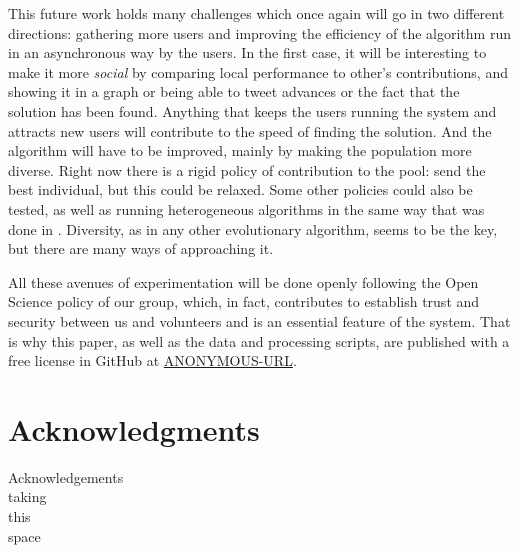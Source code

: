 \documentclass[runningheads,a4paper]{llncs}\usepackage[]{graphicx}\usepackage[]{color}
\begin{document}
This future work holds many challenges which once again will go in two
different directions: gathering more users and improving the
efficiency of the algorithm run in an asynchronous way by the
users. In the first case, it will be interesting to make it more {\em
  social} by comparing local performance to other's contributions, and
showing it in a graph or being able to tweet advances or the fact that
the solution has been found. Anything that keeps the users running the
system and attracts new users will contribute to the speed of finding
the solution. And the algorithm will have to be improved, mainly by
making the population more diverse. Right now there is a rigid policy
of contribution to the pool: send the best individual, but this could
be relaxed. Some other policies could also be tested, as well as
running heterogeneous algorithms in the same way that was done in
\cite{DBLP:journals/grid/ValdezTGVO15}. Diversity, as in any other
evolutionary algorithm, seems to be the key, but there are many ways of
approaching it. 

All these avenues of experimentation will be done openly following the
Open Science policy of our group, which, in fact, contributes to
establish trust and security between us and volunteers and is an
essential feature of the system. That is why this paper, as well as
the data and processing scripts, are published with a free license in GitHub at
\url{ANONYMOUS-URL}.

\section*{Acknowledgments}

Acknowledgements\\
taking\\
this\\
space



\end{document}
